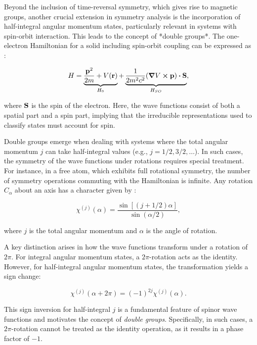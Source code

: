 Beyond the inclusion of time-reversal symmetry, which gives rise to magnetic groups, another crucial extension in symmetry analysis is the incorporation of half-integral angular momentum states, particularly relevant in systems with spin-orbit interaction. This leads to the concept of *double groups*. The one-electron Hamiltonian for a solid including spin-orbit coupling can be expressed as \cite{dresselhaus}:

\begin{equation} \label{eq:one_electron_hamiltonian_spin_orbit}
H = \underbrace{\frac{\p^2}{2m} + V(\r)}_{H_0} +
\underbrace{\frac{1}{2m^2c^2} (\grad{V} \cross \p) \vdot \vb{S}}_{H_{SO}},
\end{equation}

where \(\vb{S}\) is the spin of the electron. Here, the wave functions consist of both a spatial part and a spin part, implying that the irreducible representations used to classify states must account for spin.

Double groups emerge when dealing with systems where the total angular momentum \(j\) can take half-integral values (e.g., \(j = 1/2, 3/2, \dots\)). In such cases, the symmetry of the wave functions under rotations requires special treatment. For instance, in a free atom, which exhibits full rotational symmetry, the number of symmetry operations commuting with the Hamiltonian is infinite. Any rotation \(C_\alpha\) about an axis has a character given by \cite{dresselhaus}:

\begin{equation} \label{eq:character_chi_alpha_rotation}
\chi^{(j)}(\alpha) = \frac{\sin[(j+1/2)\alpha]}{\sin(\alpha/2)},
\end{equation}

where \(j\) is the total angular momentum and \(\alpha\) is the angle of rotation.

A key distinction arises in how the wave functions transform under a rotation of \(2\pi\). For integral angular momentum states, a \(2\pi\)-rotation acts as the identity. However, for half-integral angular momentum states, the transformation yields a sign change:

\begin{equation} \label{eq:rotation_by_2pi_half-integral}
\chi^{(j)}(\alpha+2\pi) = (-1)^{2j} \chi^{(j)}(\alpha).
\end{equation}

This sign inversion for half-integral \(j\) is a fundamental feature of spinor wave functions and motivates the concept of \textit{double groups}. Specifically, in such cases, a \(2\pi\)-rotation cannot be treated as the identity operation, as it results in a phase factor of \(-1\).

